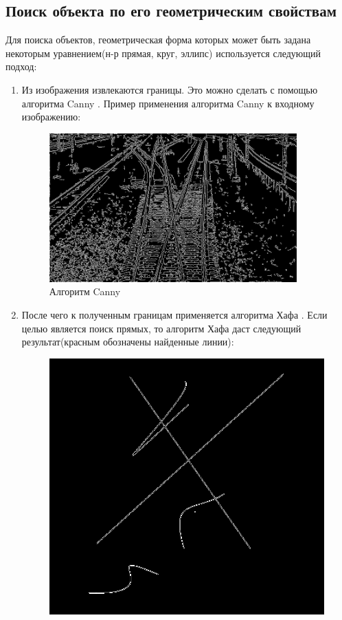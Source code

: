 \subsection{Поиск объекта по его геометрическим свойствам}
Для поиска объектов, геометрическая форма которых может быть задана некоторым уравнением(н-р прямая, круг, эллипс) используется следующий подход:
\begin{enumerate}
	\item Из изображения извлекаются границы. Это можно сделать с помощью алгоритма Canny \cite{b:canny}. \newline
	Пример применения алгоритма Canny к входному изображению:
	\begin{figure}[!h]
		\centering
		\includegraphics[width=0.9\textwidth]{pictures/canny_res}
		\caption[Применение алгоритма Canny]{Алгоритм Canny}
		\label{fig:cannyres}
	\end{figure}
	\item После чего к полученным границам применяется алгоритма Хафа \cite{b:hough_transform}. Если целью является поиск прямых, то алгоритм Хафа даст следующий результат(красным обозначены найденные линии):
	\begin{figure}[!h]
		\centering
		\begin{minipage}{0.45\textwidth}
			\centering
			\includegraphics[width=0.7\linewidth]{pictures/canny_ex}

\end{minipage}
\end{figure}
\end{enumerate}

